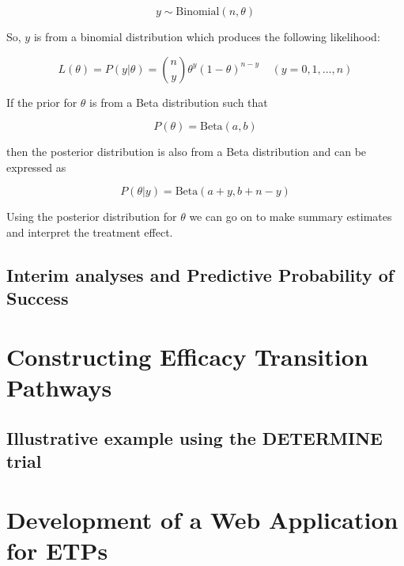 \begin{equation}
	y \sim \text{Binomial}(n, \theta)
\end{equation}

So, $y$ is from a binomial distribution which produces the following likelihood: 

\begin{equation}
	L(\theta) = P(y|\theta) = {n \choose y}\theta^y (1-\theta)^{n-y} \; \; \; \; (y = 0,1,\ldots,n)
\end{equation}

If the prior for $\theta$ is from a Beta distribution such that 

\begin{equation}
	P(\theta) = \text{Beta}(a,b)
\end{equation}

then the posterior distribution is also from a Beta distribution and can be expressed as 

\begin{equation}
	P(\theta|y) = \text{Beta}(a+y,b+n-y)
\end{equation}

Using the posterior distribution for $\theta$ we can go on to make summary estimates and interpret the treatment effect. 

\subsection{Interim analyses and Predictive Probability of Success}


\section{Constructing Efficacy Transition Pathways}


\subsection{Illustrative example using the DETERMINE trial}


\section{Development of a Web Application for ETPs}